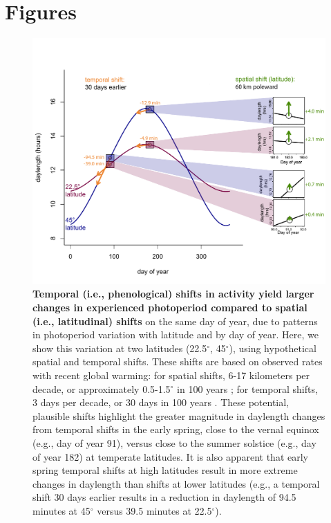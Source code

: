 \documentclass{article}
\begin{document}
\section* {Figures}

\begin{figure}[h]
\centering
\includegraphics{..//..//analyses/photoperiod/figures/photo_spacetime_v4b_newcolors.pdf} %
\caption{\textbf{Temporal (i.e., phenological) shifts in activity yield larger changes in experienced photoperiod compared to spatial (i.e., latitudinal) shifts} on the same day of year, due to patterns in photoperiod variation with latitude and by day of year. Here, we show this variation at two latitudes (22.5$^{\circ}$, 45$^{\circ}$), using hypothetical spatial and temporal shifts. These shifts are based on observed rates with recent global warming: for spatial shifts, 6-17 kilometers per decade, or approximately 0.5-1.5$^{\circ}$ in 100 years \citep{parmesan2003,parmesan2006}; for temporal shifts, 3 days per decade, or 30 days in 100 years \citep{parmesan2006,chen2011}. These potential, plausible shifts highlight the greater magnitude in daylength changes from temporal shifts in the early spring, close to the vernal equinox (e.g., day of year 91), versus close to the summer solstice (e.g., day of year 182) at temperate latitudes.  It is also apparent that early spring temporal shifts at high latitudes result in more extreme changes in daylength than shifts at lower latitudes (e.g., a temporal shift 30 days earlier results in a reduction in daylength of 94.5 minutes at 45$^{\circ}$ versus 39.5 minutes at 22.5$^{\circ}$).}
 \label{fig:spacetime}%
 \end{figure}
 
\end{document}
